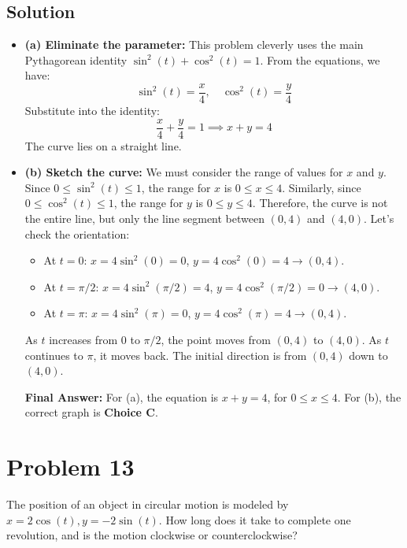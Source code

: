 \documentclass{article}
\begin{document}
\subsection*{Solution}
\begin{itemize}
    \item \textbf{(a) Eliminate the parameter:}
    This problem cleverly uses the main Pythagorean identity $\sin^2(t) + \cos^2(t) = 1$.
    From the equations, we have:
    \[ \sin^2(t) = \frac{x}{4}, \quad \cos^2(t) = \frac{y}{4} \]
    Substitute into the identity:
    \[ \frac{x}{4} + \frac{y}{4} = 1 \implies x + y = 4 \]
    The curve lies on a straight line.

    \item \textbf{(b) Sketch the curve:}
    We must consider the range of values for $x$ and $y$.
    Since $0 \le \sin^2(t) \le 1$, the range for $x$ is $0 \le x \le 4$.
    Similarly, since $0 \le \cos^2(t) \le 1$, the range for $y$ is $0 \le y \le 4$.
    Therefore, the curve is not the entire line, but only the line segment between $(0, 4)$ and $(4, 0)$.
    Let's check the orientation:
    \begin{itemize}
        \item At $t = 0$: $x = 4\sin^2(0)=0$, $y=4\cos^2(0)=4 \rightarrow (0, 4)$.
        \item At $t = \pi/2$: $x = 4\sin^2(\pi/2)=4$, $y=4\cos^2(\pi/2)=0 \rightarrow (4, 0)$.
        \item At $t = \pi$: $x = 4\sin^2(\pi)=0$, $y=4\cos^2(\pi)=4 \rightarrow (0, 4)$.
    \end{itemize}
    As $t$ increases from $0$ to $\pi/2$, the point moves from $(0, 4)$ to $(4, 0)$. As $t$ continues to $\pi$, it moves back. The initial direction is from $(0, 4)$ down to $(4, 0)$.

    \textbf{Final Answer:} For (a), the equation is $x+y=4$, for $0 \le x \le 4$. For (b), the correct graph is \textbf{Choice C}.
\end{itemize}

\section{Problem 13}
The position of an object in circular motion is modeled by $x = 2 \cos(t), y = -2 \sin(t)$. How long does it take to complete one revolution, and is the motion clockwise or counterclockwise?
\end{document}
